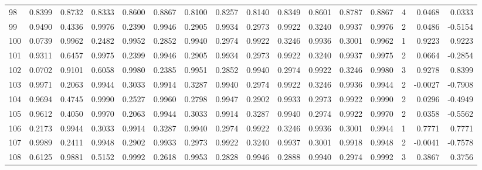 \begin{tabular}{lrrrrrrrrrrrrrrr}
98  &      0.8399 &  0.8732 &  0.8333 &  0.8600 &  0.8867 &  0.8100 &  0.8257 &  0.8140 &  0.8349 &  0.8601 &   0.8787 &     0.8867 &      4 &                    0.0468 &                     0.0333 \\
99  &      0.9490 &  0.4336 &  0.9976 &  0.2390 &  0.9946 &  0.2905 &  0.9934 &  0.2973 &  0.9922 &  0.3240 &   0.9937 &     0.9976 &      2 &                    0.0486 &                    -0.5154 \\
100 &      0.0739 &  0.9962 &  0.2482 &  0.9952 &  0.2852 &  0.9940 &  0.2974 &  0.9922 &  0.3246 &  0.9936 &   0.3001 &     0.9962 &      1 &                    0.9223 &                     0.9223 \\
101 &      0.9311 &  0.6457 &  0.9975 &  0.2399 &  0.9946 &  0.2905 &  0.9934 &  0.2973 &  0.9922 &  0.3240 &   0.9937 &     0.9975 &      2 &                    0.0664 &                    -0.2854 \\
102 &      0.0702 &  0.9101 &  0.6058 &  0.9980 &  0.2385 &  0.9951 &  0.2852 &  0.9940 &  0.2974 &  0.9922 &   0.3246 &     0.9980 &      3 &                    0.9278 &                     0.8399 \\
103 &      0.9971 &  0.2063 &  0.9944 &  0.3033 &  0.9914 &  0.3287 &  0.9940 &  0.2974 &  0.9922 &  0.3246 &   0.9936 &     0.9944 &      2 &                   -0.0027 &                    -0.7908 \\
104 &      0.9694 &  0.4745 &  0.9990 &  0.2527 &  0.9960 &  0.2798 &  0.9947 &  0.2902 &  0.9933 &  0.2973 &   0.9922 &     0.9990 &      2 &                    0.0296 &                    -0.4949 \\
105 &      0.9612 &  0.4050 &  0.9970 &  0.2063 &  0.9944 &  0.3033 &  0.9914 &  0.3287 &  0.9940 &  0.2974 &   0.9922 &     0.9970 &      2 &                    0.0358 &                    -0.5562 \\
106 &      0.2173 &  0.9944 &  0.3033 &  0.9914 &  0.3287 &  0.9940 &  0.2974 &  0.9922 &  0.3246 &  0.9936 &   0.3001 &     0.9944 &      1 &                    0.7771 &                     0.7771 \\
107 &      0.9989 &  0.2411 &  0.9948 &  0.2902 &  0.9933 &  0.2973 &  0.9922 &  0.3240 &  0.9937 &  0.3001 &   0.9918 &     0.9948 &      2 &                   -0.0041 &                    -0.7578 \\
108 &      0.6125 &  0.9881 &  0.5152 &  0.9992 &  0.2618 &  0.9953 &  0.2828 &  0.9946 &  0.2888 &  0.9940 &   0.2974 &     0.9992 &      3 &                    0.3867 &                     0.3756 \\

\end{tabular}
